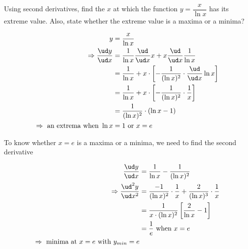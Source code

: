 

\question[3] Using second derivatives, find the $x$ at which the function 
$y = \dfrac{x}{\ln x}$ has its extreme value. Also, state whether the extreme 
value is a maxima or a minima? 


\ifprintanswers
\fi 

\begin{solution}[\fullpage]
	\begin{align}
	   y &= \dfrac{x}{\ln x} \\
	   \Rightarrow \dfrac{\ud y}{\ud x} &= \dfrac{1}{\ln x}\dfrac{\ud}{\ud x}x 
	             + x\dfrac{\ud}{\ud x}\dfrac{1}{\ln x} \\
       &= \dfrac{1}{\ln x} + x\cdot\left[ -\dfrac{1}{(\ln x)^2} \cdot\dfrac{\ud}{\ud x}\ln x\right] \\
       &= \dfrac{1}{\ln x} + x\cdot\left[ -\dfrac{1}{(\ln x)^2} \cdot\dfrac{1}{x}\right] \\
	     &= \dfrac{1}{(\ln x)^2}\cdot(\ln x - 1) \\
	     \Rightarrow \text{ an extrema when } \ln x &= 1 \text{ or } x = e
	\end{align}
	
	To know whether $x=e$ is a maxima or a minima, we need to find the second derivative
	
	\begin{align}
	   \dfrac{\ud y}{\ud x} &= \dfrac{1}{\ln x} - \dfrac{1}{(\ln x)^2} \\
	   \Rightarrow \dfrac{\ud^2 y}{\ud x^2} &= \dfrac{-1}{(\ln x)^2}\cdot\dfrac{1}{x}
	                                        + \dfrac{2}{(\ln x)^3}\cdot\dfrac{1}{x} \\
	               &= \dfrac{1}{x\cdot(\ln x)^2}\left[ \dfrac{2}{\ln x} - 1\right] \\
	               &= \dfrac{1}{e} \text{ when } x = e \\
	               \Rightarrow \text{ minima at } x = e \text{ with } y_{min} = e
	\end{align}
\end{solution}
